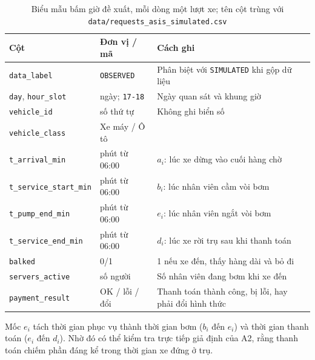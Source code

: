 \begin{table}[htbp]\centering\small
\caption{Biểu mẫu bấm giờ đề xuất, mỗi dòng một lượt xe; tên cột trùng với \texttt{data/requests\_asis\_simulated.csv}}
\label{r2:form}
\begin{tabularx}{\linewidth}{@{}p{39mm}p{24mm}Y@{}}
\toprule
Cột & Đơn vị / mã & Cách ghi \\
\midrule
\texttt{data\_label} & \texttt{OBSERVED} & Phân biệt với \texttt{SIMULATED} khi gộp dữ liệu \\
\texttt{day}, \texttt{hour\_slot} & ngày; \texttt{17-18} & Ngày quan sát và khung giờ \\
\texttt{vehicle\_id} & số thứ tự & Không ghi biển số \\
\texttt{vehicle\_class} & Xe máy / Ô tô & \\
\texttt{t\_arrival\_min} & phút từ 06:00 & $a_i$: lúc xe dừng vào cuối hàng chờ \\
\texttt{t\_service\_start\_min} & phút từ 06:00 & $b_i$: lúc nhân viên cầm vòi bơm \\
\texttt{t\_pump\_end\_min} & phút từ 06:00 & $e_i$: lúc nhân viên ngắt vòi bơm \\
\texttt{t\_service\_end\_min} & phút từ 06:00 & $d_i$: lúc xe rời trụ sau khi thanh toán \\
\texttt{balked} & 0/1 & 1 nếu xe đến, thấy hàng dài và bỏ đi \\
\texttt{servers\_active} & số người & Số nhân viên đang bơm khi xe đến \\
\texttt{payment\_result} & OK / lỗi / đổi & Thanh toán thành công, bị lỗi, hay phải đổi hình thức \\
\bottomrule
\end{tabularx}
\end{table}

Mốc $e_i$ tách thời gian phục vụ thành thời gian bơm ($b_i$ đến $e_i$) và thời
gian thanh toán ($e_i$ đến $d_i$). Nhờ đó có thể kiểm tra trực tiếp giả định
của A2, rằng thanh toán chiếm phần đáng kể trong thời gian xe đứng ở trụ.

